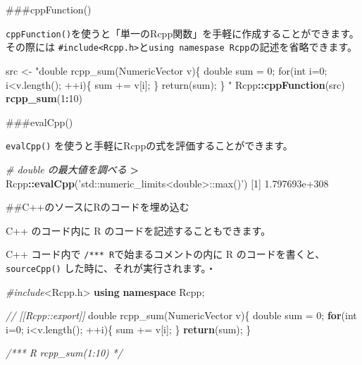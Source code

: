 \documentclass[]{book}
\newenvironment{Shaded}{\begin{snugshade}}{\end{snugshade}}
\newcommand{\CommentTok}[1]{\textcolor[rgb]{0.56,0.35,0.01}{\textit{#1}}}
\newcommand{\ControlFlowTok}[1]{\textcolor[rgb]{0.13,0.29,0.53}{\textbf{#1}}}
\newcommand{\DataTypeTok}[1]{\textcolor[rgb]{0.13,0.29,0.53}{#1}}
\newcommand{\DecValTok}[1]{\textcolor[rgb]{0.00,0.00,0.81}{#1}}
\newcommand{\FloatTok}[1]{\textcolor[rgb]{0.00,0.00,0.81}{#1}}
\newcommand{\ImportTok}[1]{#1}
\newcommand{\KeywordTok}[1]{\textcolor[rgb]{0.13,0.29,0.53}{\textbf{#1}}}
\newcommand{\NormalTok}[1]{#1}
\newcommand{\OperatorTok}[1]{\textcolor[rgb]{0.81,0.36,0.00}{\textbf{#1}}}
\newcommand{\PreprocessorTok}[1]{\textcolor[rgb]{0.56,0.35,0.01}{\textit{#1}}}
\newcommand{\StringTok}[1]{\textcolor[rgb]{0.31,0.60,0.02}{#1}}
\begin{document}
\#\#\#cppFunction()

\texttt{cppFunction()}を使うと「単一のRcpp関数」を手軽に作成することができます。その際には \texttt{\#include\textless{}Rcpp.h\textgreater{}}と\texttt{using\ namespase\ Rcpp}の記述を省略できます。

\begin{Shaded}
\begin{Highlighting}[]
\NormalTok{src <-}
\StringTok{"double rcpp_sum(NumericVector v)\{}
\StringTok{  double sum = 0;}
\StringTok{  for(int i=0; i<v.length(); ++i)\{}
\StringTok{    sum += v[i];}
\StringTok{  \}}
\StringTok{  return(sum);}
\StringTok{\}}
\StringTok{"}
\NormalTok{Rcpp}\OperatorTok{::}\KeywordTok{cppFunction}\NormalTok{(src)}
\KeywordTok{rcpp_sum}\NormalTok{(}\DecValTok{1}\OperatorTok{:}\DecValTok{10}\NormalTok{)}
\end{Highlighting}
\end{Shaded}

\#\#\#evalCpp()

\texttt{evalCpp()} を使うと手軽にRcppの式を評価することができます。

\begin{Shaded}
\begin{Highlighting}[]
\CommentTok{# double の最大値を調べる}
\OperatorTok{>}\StringTok{ }\NormalTok{Rcpp}\OperatorTok{::}\KeywordTok{evalCpp}\NormalTok{(}\StringTok{'std::numeric_limits<double>::max()'}\NormalTok{)}
\NormalTok{[}\DecValTok{1}\NormalTok{] }\FloatTok{1.797693e+308}
\end{Highlighting}
\end{Shaded}

\#\#C++のソースにRのコードを埋め込む

C++ のコード内に R のコードを記述することもできます。

C++ コード内で \texttt{/***\ R}で始まるコメントの内に R のコードを書くと、\texttt{sourceCpp()} した時に、それが実行されます。・

\begin{Shaded}
\begin{Highlighting}[]
\PreprocessorTok{#include}\ImportTok{<Rcpp.h>}
\KeywordTok{using} \KeywordTok{namespace}\NormalTok{ Rcpp;}

\CommentTok{// [[Rcpp::export]]}
\DataTypeTok{double}\NormalTok{ rcpp_sum(NumericVector v)\{}
    \DataTypeTok{double}\NormalTok{ sum = }\DecValTok{0}\NormalTok{;}
    \ControlFlowTok{for}\NormalTok{(}\DataTypeTok{int}\NormalTok{ i=}\DecValTok{0}\NormalTok{; i<v.length(); ++i)\{}
\NormalTok{        sum += v[i];}
\NormalTok{    \}}
    \ControlFlowTok{return}\NormalTok{(sum);}
\NormalTok{\}}

\CommentTok{/*** R}
\CommentTok{rcpp_sum(1:10)}
\CommentTok{*/}
\end{Highlighting}
\end{Shaded}
\end{document}
